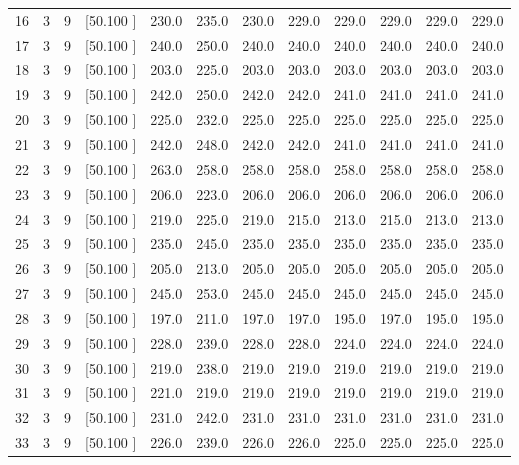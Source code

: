 \documentclass[12pt,a4paper]{article}
\begin{document}
\begin{center}
{\begin{tabular}{r r r r r r r r r r r r}
  16&  3&  9&[50.100    ]&   230.0&   235.0&   230.0&   229.0&   229.0&   229.0&   229.0&   229.0\\[-0.02in]
  17&  3&  9&[50.100    ]&   240.0&   250.0&   240.0&   240.0&   240.0&   240.0&   240.0&   240.0\\[-0.02in]
  18&  3&  9&[50.100    ]&   203.0&   225.0&   203.0&   203.0&   203.0&   203.0&   203.0&   203.0\\[-0.02in]
  19&  3&  9&[50.100    ]&   242.0&   250.0&   242.0&   242.0&   241.0&   241.0&   241.0&   241.0\\[-0.02in]
  20&  3&  9&[50.100    ]&   225.0&   232.0&   225.0&   225.0&   225.0&   225.0&   225.0&   225.0\\[-0.02in]
  21&  3&  9&[50.100    ]&   242.0&   248.0&   242.0&   242.0&   241.0&   241.0&   241.0&   241.0\\[-0.02in]
  22&  3&  9&[50.100    ]&   263.0&   258.0&   258.0&   258.0&   258.0&   258.0&   258.0&   258.0\\[-0.02in]
  23&  3&  9&[50.100    ]&   206.0&   223.0&   206.0&   206.0&   206.0&   206.0&   206.0&   206.0\\[-0.02in]
  24&  3&  9&[50.100    ]&   219.0&   225.0&   219.0&   215.0&   213.0&   215.0&   213.0&   213.0\\[-0.02in]
  25&  3&  9&[50.100    ]&   235.0&   245.0&   235.0&   235.0&   235.0&   235.0&   235.0&   235.0\\[-0.02in]
  26&  3&  9&[50.100    ]&   205.0&   213.0&   205.0&   205.0&   205.0&   205.0&   205.0&   205.0\\[-0.02in]
  27&  3&  9&[50.100    ]&   245.0&   253.0&   245.0&   245.0&   245.0&   245.0&   245.0&   245.0\\[-0.02in]
  28&  3&  9&[50.100    ]&   197.0&   211.0&   197.0&   197.0&   195.0&   197.0&   195.0&   195.0\\[-0.02in]
  29&  3&  9&[50.100    ]&   228.0&   239.0&   228.0&   228.0&   224.0&   224.0&   224.0&   224.0\\[-0.02in]
  30&  3&  9&[50.100    ]&   219.0&   238.0&   219.0&   219.0&   219.0&   219.0&   219.0&   219.0\\[-0.02in]
  31&  3&  9&[50.100    ]&   221.0&   219.0&   219.0&   219.0&   219.0&   219.0&   219.0&   219.0\\[-0.02in]
  32&  3&  9&[50.100    ]&   231.0&   242.0&   231.0&   231.0&   231.0&   231.0&   231.0&   231.0\\[-0.02in]
  33&  3&  9&[50.100    ]&   226.0&   239.0&   226.0&   226.0&   225.0&   225.0&   225.0&   225.0\\[-0.02in]

\end{tabular}}
\end{center}
\end{document}
